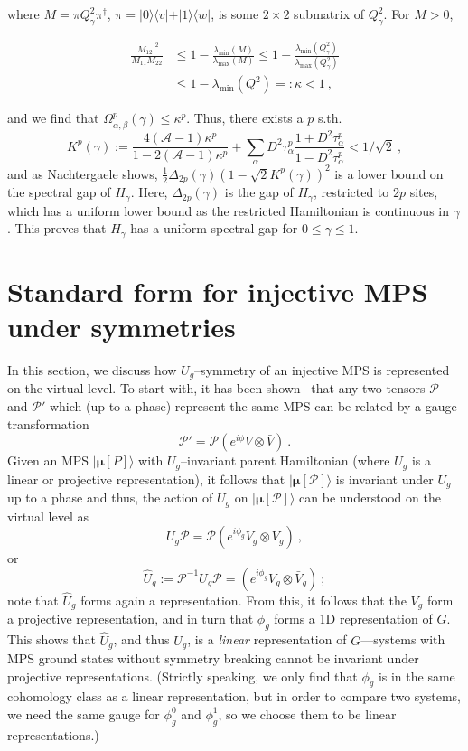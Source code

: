 \documentclass[twocolumn,superscriptaddress,prb,linenumbers]{revtex4-1}
\newcommand{\ket}[1]{\vert#1\rangle}
\newcommand{\bra}[1]{\langle#1\vert}
\newcommand{\MPS}[1]{| {\bm\mu}[#1]\rangle}
\newcommand{\mc}[1]{\mathcal{#1}}
\begin{document}
where $M=\pi Q_\gamma^2\pi^\dagger$,
$\pi=\ket{0}\!\bra{v}+\ket{1}\!\bra{w}$,
is some $2\times2$ submatrix of $Q_\gamma^2$. For $M>0$,
\begin{linenomath}
    \begin{align*}
        \frac{|M_{12}|^2}{M_{11}M_{22}}
         & \le
        1-\frac{\lambda_{\min}(M)}{\lambda_{\max}(M)}
        \le
        1-\frac{\lambda_{\min}(Q_\gamma^2)}{\lambda_{\max}(Q_\gamma^2)}
        \\
         & \le
        1-\lambda_{\min}(Q^2)=:\kappa
        < 1\ ,
    \end{align*}
\end{linenomath}
and we find that $\Omega^p_{\alpha,\beta}(\gamma) \le \kappa^p$.
Thus, there exists a $p$ s.th.\
\[
    K^p(\gamma):=
    \frac{4(\mathcal A-1)\kappa^p}{1-2(\mathcal A-1)\kappa^p}
    +\sum_\alpha D^2 \tau^p_\alpha\frac{1+D^2\tau^p_\alpha}{1-D^2\tau^p_\alpha}
    <1/\sqrt{2}\ ,
\]
and as Nachtergaele shows,\cite{nachtergaele:degen-mps}
$\tfrac12\Delta_{2p}(\gamma)(1-\sqrt{2} K^p(\gamma))^2$ is a lower bound
on the spectral gap of $H_\gamma$. Here, $\Delta_{2p}(\gamma)$ is
the gap of $H_\gamma$, restricted to $2p$ sites, which has a uniform
lower bound as the restricted Hamiltonian is continuous in $\gamma$.
This proves that $H_\gamma$ has a uniform spectral gap for $0\le\gamma\le
    1$.



\section{Standard form for injective MPS under symmetries
  \label{app:stform-inj-sym}}

In this section, we discuss how $U_g$--symmetry of an injective MPS is
represented on the virtual level.  To start with, it has been
shown~\cite{david:stringorder-1d} that any two tensors $\mc P$ and $\mc
    P'$ which (up to a phase) represent the same MPS can be related by a gauge
transformation
\[
    \mc P' = \mc P (e^{i\phi} V\otimes \bar V)\ .
\]
Given an MPS $\MPS{P}$ with $U_g$--invariant parent Hamiltonian (where
$U_g$ is a linear or projective representation), it follows that $\MPS{\mc
        P}$ is invariant under $U_g$ up to a phase and thus, the action of $U_g$
on $\MPS{\mc P}$ can be understood on the virtual level as
\begin{equation}
    \label{eq:app-inj-sform:sform}
    U_g\mc P= \mc P (e^{i\phi_g} V_g\otimes \bar V_g)\ ,
\end{equation}
or
\[
    \hat U_g :=\mc P^{-1} U_g\mc P= (e^{i\phi_g} V_g\otimes \bar V_g)\ ;
\]
note that $\hat U_g$ forms again a representation.  From this, it follows
that the $V_g$ form a projective representation, and in turn that $\phi_g$
forms a 1D representation of $G$. This shows that $\hat U_g$, and thus
$U_g$, is a \emph{linear} representation of $G$---systems with MPS ground
states without symmetry breaking cannot be invariant under projective
representations.  (Strictly speaking, we only find that $\phi_g$ is in the
same cohomology class as a linear representation, but in order to compare
two systems, we need the same gauge for $\phi_g^0$ and $\phi_g^1$, so we
choose them to be linear representations.)
\end{document}
